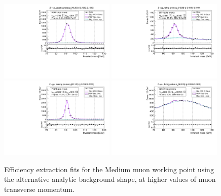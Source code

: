 {\begin{figure}
\centering
\includegraphics[width=0.49\textwidth]{figures/Zmm_RecoTemplate_BkgAnalytic_pass_ptBin7_etaBin0.pdf}
\includegraphics[width=0.49\textwidth]{figures/Zmm_RecoTemplate_BkgAnalytic_fail_ptBin7_etaBin0.pdf}
\includegraphics[width=0.49\textwidth]{figures/Zmm_RecoTemplate_BkgAnalytic_pass_ptBin10_etaBin6.pdf}
\includegraphics[width=0.49\textwidth]{figures/Zmm_RecoTemplate_BkgAnalytic_fail_ptBin10_etaBin6.pdf}
\caption{Efficiency extraction fits for the Medium muon working point using the alternative analytic background shape, at higher values of muon transverse momentum.}
\label{fig:ZmmAltBkgFits2}
\end{figure}

}
